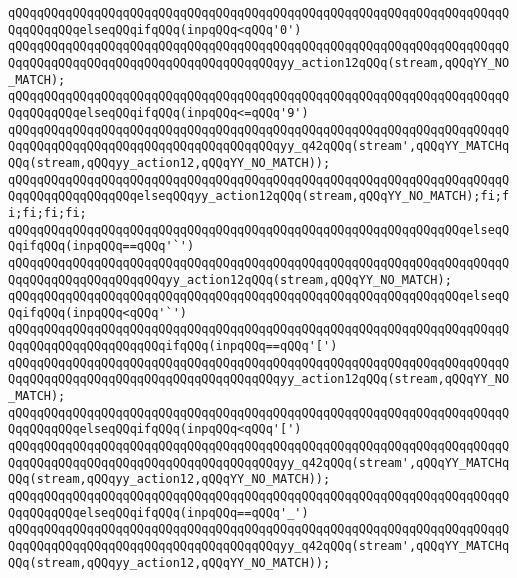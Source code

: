 \verb|qQQqqQQqqQQqqQQqqQQqqQQqqQQqqQQqqQQqqQQqqQQqqQQqqQQqqQQqqQQqqQQqqQQqqQQqqQQqqQQqelseqQQqifqQQq(inpqQQq<qQQq'0')|\newline
\verb|qQQqqQQqqQQqqQQqqQQqqQQqqQQqqQQqqQQqqQQqqQQqqQQqqQQqqQQqqQQqqQQqqQQqqQQqqQQqqQQqqQQqqQQqqQQqqQQqqQQqqQQqqQQqyy_action12qQQq(stream,qQQqYY_NO_MATCH);|\newline
\verb|qQQqqQQqqQQqqQQqqQQqqQQqqQQqqQQqqQQqqQQqqQQqqQQqqQQqqQQqqQQqqQQqqQQqqQQqqQQqqQQqelseqQQqifqQQq(inpqQQq<=qQQq'9')|\newline
\verb|qQQqqQQqqQQqqQQqqQQqqQQqqQQqqQQqqQQqqQQqqQQqqQQqqQQqqQQqqQQqqQQqqQQqqQQqqQQqqQQqqQQqqQQqqQQqqQQqqQQqqQQqqQQqyy_q42qQQq(stream',qQQqYY_MATCHqQQq(stream,qQQqyy_action12,qQQqYY_NO_MATCH));|\newline
\verb|qQQqqQQqqQQqqQQqqQQqqQQqqQQqqQQqqQQqqQQqqQQqqQQqqQQqqQQqqQQqqQQqqQQqqQQqqQQqqQQqqQQqqQQqelseqQQqyy_action12qQQq(stream,qQQqYY_NO_MATCH);fi;fi;fi;fi;fi;|\newline
\verb|qQQqqQQqqQQqqQQqqQQqqQQqqQQqqQQqqQQqqQQqqQQqqQQqqQQqqQQqqQQqqQQqelseqQQqifqQQq(inpqQQq==qQQq'`')|\newline
\verb|qQQqqQQqqQQqqQQqqQQqqQQqqQQqqQQqqQQqqQQqqQQqqQQqqQQqqQQqqQQqqQQqqQQqqQQqqQQqqQQqqQQqqQQqqQQqyy_action12qQQq(stream,qQQqYY_NO_MATCH);|\newline
\verb|qQQqqQQqqQQqqQQqqQQqqQQqqQQqqQQqqQQqqQQqqQQqqQQqqQQqqQQqqQQqqQQqelseqQQqifqQQq(inpqQQq<qQQq'`')|\newline
\verb|qQQqqQQqqQQqqQQqqQQqqQQqqQQqqQQqqQQqqQQqqQQqqQQqqQQqqQQqqQQqqQQqqQQqqQQqqQQqqQQqqQQqqQQqqQQqifqQQq(inpqQQq==qQQq'[')|\newline
\verb|qQQqqQQqqQQqqQQqqQQqqQQqqQQqqQQqqQQqqQQqqQQqqQQqqQQqqQQqqQQqqQQqqQQqqQQqqQQqqQQqqQQqqQQqqQQqqQQqqQQqqQQqqQQqyy_action12qQQq(stream,qQQqYY_NO_MATCH);|\newline
\verb|qQQqqQQqqQQqqQQqqQQqqQQqqQQqqQQqqQQqqQQqqQQqqQQqqQQqqQQqqQQqqQQqqQQqqQQqqQQqqQQqelseqQQqifqQQq(inpqQQq<qQQq'[')|\newline
\verb|qQQqqQQqqQQqqQQqqQQqqQQqqQQqqQQqqQQqqQQqqQQqqQQqqQQqqQQqqQQqqQQqqQQqqQQqqQQqqQQqqQQqqQQqqQQqqQQqqQQqqQQqqQQqyy_q42qQQq(stream',qQQqYY_MATCHqQQq(stream,qQQqyy_action12,qQQqYY_NO_MATCH));|\newline
\verb|qQQqqQQqqQQqqQQqqQQqqQQqqQQqqQQqqQQqqQQqqQQqqQQqqQQqqQQqqQQqqQQqqQQqqQQqqQQqqQQqelseqQQqifqQQq(inpqQQq==qQQq'_')|\newline
\verb|qQQqqQQqqQQqqQQqqQQqqQQqqQQqqQQqqQQqqQQqqQQqqQQqqQQqqQQqqQQqqQQqqQQqqQQqqQQqqQQqqQQqqQQqqQQqqQQqqQQqqQQqqQQqyy_q42qQQq(stream',qQQqYY_MATCHqQQq(stream,qQQqyy_action12,qQQqYY_NO_MATCH));|\newline
